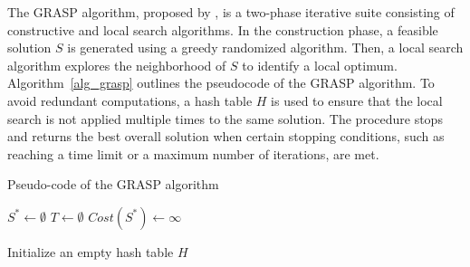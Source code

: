 \documentclass{article}
\begin{document}
The GRASP algorithm, proposed by \cite{feo1989probabilistic}, is a two-phase iterative suite consisting of constructive and local search algorithms. In the construction phase, a feasible solution $S$ is generated using a greedy randomized algorithm. Then, a local search algorithm explores the neighborhood of $S$ to identify a local optimum. Algorithm~\ref{alg_grasp} outlines the pseudocode of the GRASP algorithm. To avoid redundant computations, a hash table $H$ is used to ensure that the local search is not applied multiple times to the same solution.  The procedure stops and returns the best overall solution when certain stopping conditions, such as reaching a time limit or a maximum number of iterations, are met. %

    {
        {\small
        \begin{algorithm}[hbpt]
            \caption{Pseudo-code of the GRASP algorithm }
            \label{alg_grasp}
            \DontPrintSemicolon
            \LinesNumbered
            \setcounter{AlgoLine}{0}
            $S^* \leftarrow \emptyset$    \hspace{2mm} $T \leftarrow \emptyset$       $Cost(S^*) \leftarrow \infty$

            Initialize an empty hash table $H$



        \end{algorithm}}
    }
\end{document}

